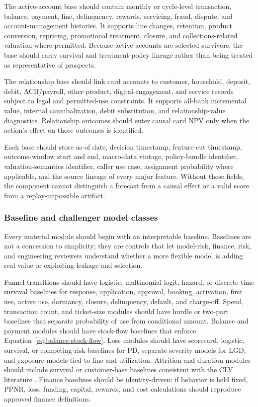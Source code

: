 \documentclass[11pt]{article}
\newcommand{\1}{\mathbf{1}}
\begin{document}
The active-account base should contain monthly or cycle-level transaction,
balance, payment, line, delinquency, rewards, servicing, fraud, dispute, and
account-management histories. It supports line changes, retention, product
conversion, repricing, promotional treatment, closure, and collections-related
valuation where permitted. Because active accounts are selected survivors, the
base should carry survival and treatment-policy lineage rather than being
treated as representative of prospects.

The relationship base should link card accounts to customer, household,
deposit, debit, ACH/payroll, other-product, digital-engagement, and service
records subject to legal and permitted-use constraints. It supports all-bank
incremental value, internal cannibalization, debit substitution, and
relationship-value diagnostics. Relationship outcomes should enter causal card
NPV only when the action's effect on those outcomes is identified.

Each base should store as-of date, decision timestamp, feature-cut timestamp,
outcome-window start and end, macro-data vintage, policy-bundle identifier,
valuation-semantics identifier, caller use case, assignment probability where
applicable, and the source lineage of every major feature. Without these
fields, the component cannot distinguish a forecast from a causal effect or a
valid score from a replay-impossible artifact.

\subsubsection{Baseline and challenger model classes}
\label{subsec:model-classes}

Every material module should begin with an interpretable baseline. Baselines
are not a concession to simplicity; they are controls that let model-risk,
finance, risk, and engineering reviewers understand whether a more flexible
model is adding real value or exploiting leakage and selection.

Funnel transitions should have logistic, multinomial-logit, hazard, or
discrete-time survival baselines for response, application, approval, booking,
activation, first use, active use, dormancy, closure, delinquency, default,
and charge-off. Spend, transaction count, and ticket-size modules should have
hurdle or two-part baselines that separate probability of use from conditional
amount. Balance and payment modules should have stock-flow baselines that
enforce Equation~\eqref{eq:balance-stock-flow}. Loss modules should have
scorecard, logistic, survival, or competing-risk baselines for PD, separate
severity models for LGD, and exposure models tied to line and utilization.
Attrition and duration modules should include survival or customer-base
baselines consistent with the CLV literature
\citep{schmittlein1987counting,fader2005bgnbd,bolton1998duration}. Finance
baselines should be identity-driven: if behavior is held fixed, PPNR, loss,
funding, capital, rewards, and cost calculations should reproduce approved
finance definitions.
\end{document}
